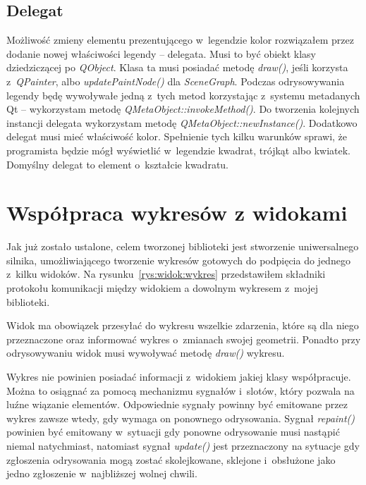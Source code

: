 \subsection{Delegat}
Możliwość zmieny elementu prezentującego w~legendzie kolor rozwiązałem przez dodanie nowej właściwości legendy -- delegata. Musi to być obiekt klasy dziedziczącej po \textit{QObject}. Klasa ta musi posiadać metodę \textit{draw()}, jeśli korzysta z~\textit{QPainter}, albo \textit{updatePaintNode()} dla \textit{SceneGraph}. Podczas odrysowywania legendy będę wywoływałe jedną z~tych metod korzystając z~systemu metadanych Qt -- wykorzystam metodę \textit{QMetaObject::invokeMethod()}. Do tworzenia kolejnych instancji delegata wykorzystam metodę \textit{QMetaObject::newInstance()}.  Dodatkowo delegat musi mieć właściwość kolor. Spełnienie tych kilku warunków sprawi, że programista będzie mógł wyświetlić w~legendzie kwadrat, trójkąt albo kwiatek. Domyślny delegat to element o~kształcie kwadratu.

\section{Współpraca wykresów z widokami }
Jak już zostało ustalone, celem tworzonej biblioteki jest stworzenie uniwersalnego silnika, umożliwiającego tworzenie wykresów gotowych do podpięcia do jednego z~kilku widoków. Na rysunku~\ref{rys:widok:wykres} przedstawiłem składniki protokołu komunikacji między widokiem a dowolnym wykresem z~mojej biblioteki.

Widok ma obowiązek przesyłać do wykresu wszelkie zdarzenia, które są dla niego przeznaczone oraz informować wykres o~zmianach swojej geometrii. Ponadto przy odrysowywaniu widok musi wywoływać metodę \textit{draw()} wykresu.

Wykres nie powinien posiadać informacji z~widokiem jakiej klasy współpracuje. Można to osiągnać za pomocą mechanizmu sygnałów i~slotów, który pozwala na luźne wiązanie elementów. Odpowiednie sygnały  powinny być emitowane przez wykres zawsze wtedy, gdy wymaga on ponownego odrysowania.
Sygnał \textit{repaint()} powinien być emitowany w~sytuacji gdy ponowne odrysowanie musi nastąpić niemal natychmiast, natomiast sygnał \textit{update()} jest przeznaczony na sytuacje gdy zgłoszenia odrysowania mogą zostać skolejkowane, sklejone i~obsłużone jako jedno zgłoszenie w~najbliższej wolnej chwili.



